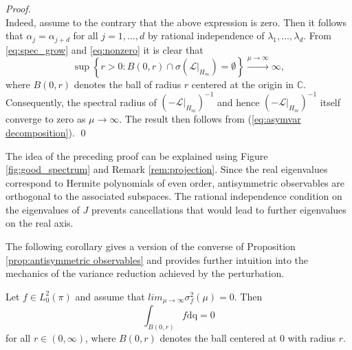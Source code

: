\begin{proof}
\begin{equation}
	\end{equation}
	Indeed, assume to the contrary that the above expression is zero. Then it follows that $\alpha_j = \alpha_{j+d}$ for all $j=1,\ldots,d$ by rational independence of $\lambda_1,\ldots,\lambda_d$.
	From \eqref{eq:spec_grow} and \eqref{eq:nonzero} it is clear that
	\begin{equation*}
	\sup \left\lbrace r>0 : B(0,r) \cap \sigma(\mathcal{L}\vert_{H_m}) = \emptyset \right\rbrace \xrightarrow{\mu \rightarrow \infty} \infty,
	\end{equation*}
	where $B(0,r)$ denotes the ball of radius $r$ centered at the origin in $\mathbb{C}$.
	Consequently, the spectral radius of $(-\mathcal{L}\vert_{H_m})^{-1}$ and hence $(-\mathcal{L}\vert_{H_m})^{-1}$ itself converge to zero as $\mu \rightarrow \infty$. The result then follows from (\ref{eq:asymvar decomposition}). \qed\end{proof}
\begin{remark}
	The idea of the preceding proof can be explained using Figure \ref{fig:good_spectrum} and Remark \ref{rem:projection}. Since the real eigenvalues correspond to Hermite polynomials of even order, antisymmetric observables are orthogonal to the associated subspaces. The rational independence condition on the eigenvalues of $J$ prevents cancellations  that would lead to further eigenvalues on the real axis.
\end{remark}
The following corollary gives a version of the converse of Proposition \ref{prop:antisymmetric observables} and provides further intuition into the mechanics of the variance reduction achieved by the perturbation.
\begin{corollary}
	Let $f\in L_{0}^{2}(\pi)$ and assume that $lim_{\mu\rightarrow\infty}\sigma_{f}^{2}(\mu)=0$. Then 
	\[
	\int_{B(0,r)}f\mathrm{dq=0}
	\]
	for all $r\in(0,\infty)$, where $B(0,r)$ denotes the ball centered at $0$ with radius $r$.
\end{corollary}
